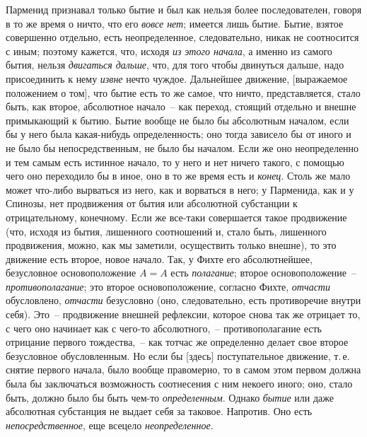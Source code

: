 Парменид признавал только бытие и был как нельзя
более последователен, говоря в то же время о ничто, что
его \emph{вовсе нет}; имеется лишь бытие. Бытие, взятое совершенно
отдельно, есть неопределенное, следовательно, никак
не соотносится с иным; поэтому кажется, что, исходя
\emph{из этого начала}, а именно из самого бытия, нельзя
\emph{двигаться дальше}, что, для того чтобы двинуться дальше,
надо присоединить к нему \emph{извне} нечто чуждое. Дальнейшее
движение, [выражаемое положением о том], что бытие
есть то же самое, что ничто, представляется, стало
быть, как второе, абсолютное начало~-- как переход, стоящий
отдельно и внешне примыкающий к бытию. Бытие
вообще не было бы абсолютным началом, если бы у него
была какая-нибудь определенность; оно тогда зависело бы
от иного и не было бы непосредственным, не было бы началом.
Если же оно неопределенно и тем самым есть
истинное начало, то у него и нет ничего такого, с помощью
чего оно переходило бы в иное, оно в то же время
есть и \emph{конец}. Столь же мало может что-либо вырваться
из него, как и ворваться в него; у Парменида, как и у
Спинозы, нет продвижения от бытия или абсолютной субстанции
к отрицательному, конечному. Если же все-таки
совершается такое продвижение (что, исходя из бытия,
лишенного соотношений и, стало быть, лишенного продвижения,
можно, как мы заметили, осуществить только
внешне), то это движение есть второе, новое начало. Так,
у Фихте его абсолютнейшее, безусловное основоположение
$A = A$ есть \emph{полагание}; второе основоположение~--
\emph{противополагание}; это второе основоположение, согласно
Фихте, \emph{отчасти} обусловлено, \emph{отчасти} безусловно (оно,
следовательно, есть противоречие внутри себя). Это~--
продвижение внешней рефлексии, которое снова так же
отрицает то, с чего оно начинает как с чего-то абсолютного,~--
противополагание есть отрицание первого тождества,~--
как тотчас же определенно делает свое второе
безусловное обусловленным. Но если бы [здесь] поступательное
движение, т.\,е. снятие первого начала, было вообще
правомерно, то в самом этом первом должна была
бы заключаться возможность соотнесения с ним некоего
иного; оно, стало быть, должно было бы быть чем-то \emph{определенным}.
Однако \emph{бытие} или даже абсолютная субстанция
не выдает себя за таковое. Напротив. Оно есть \emph{непосредственное},
еще всецело \emph{неопределенное}.

